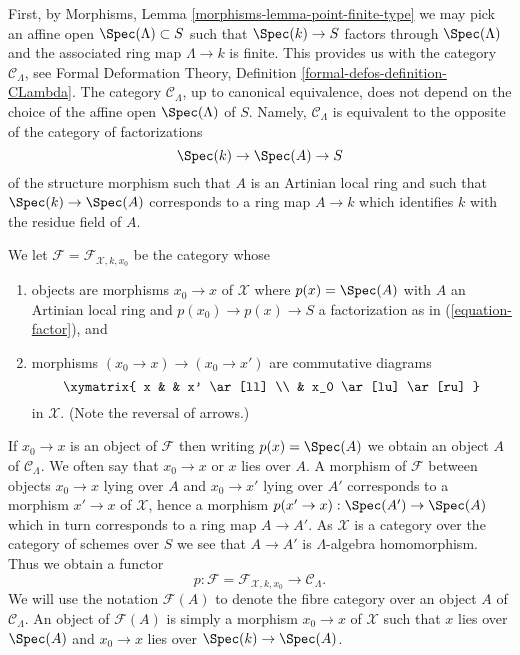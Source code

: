 \medskip\noindent
First, by Morphisms, Lemma \ref{morphisms-lemma-point-finite-type}
we may pick an affine open $\Spec(\Lambda) \subset S$ such that
$\Spec(k) \to S$ factors through $\Spec(\Lambda)$ and the associated
ring map $\Lambda \to k$ is finite. This provides us with the category
$\mathcal{C}_\Lambda$, see
Formal Deformation Theory, Definition \ref{formal-defos-definition-CLambda}.
The category $\mathcal{C}_\Lambda$, up to canonical equivalence,
does not depend on the choice of the affine open $\Spec(\Lambda)$ of $S$.
Namely, $\mathcal{C}_\Lambda$ is equivalent to the opposite
of the category of factorizations
\begin{equation}
\label{equation-factor}
\Spec(k) \to \Spec(A) \to S
\end{equation}
of the structure morphism such that $A$ is an Artinian local ring and
such that $\Spec(k) \to \Spec(A)$ corresponds to a ring map $A \to k$ which
identifies $k$ with the residue field of $A$.

\medskip\noindent
We let $\mathcal{F} = \mathcal{F}_{\mathcal{X}, k, x_0}$ be the
category whose
\begin{enumerate}
\item objects are morphisms $x_0 \to x$ of $\mathcal{X}$ where
$p(x) = \Spec(A)$ with $A$ an Artinian local ring and
$p(x_0) \to p(x) \to S$ a factorization as in (\ref{equation-factor}), and
\item morphisms $(x_0 \to x) \to (x_0 \to x')$ are commutative
diagrams
$$
\xymatrix{
x & & x' \ar[ll] \\
& x_0 \ar[lu] \ar[ru]
}
$$
in $\mathcal{X}$. (Note the reversal of arrows.)
\end{enumerate}
If $x_0 \to x$ is an object of $\mathcal{F}$ then writing $p(x) = \Spec(A)$
we obtain an object $A$ of $\mathcal{C}_\Lambda$. We often say that
$x_0 \to x$ or $x$ lies over $A$. A morphism of $\mathcal{F}$ between objects
$x_0 \to x$ lying over $A$ and $x_0 \to x'$ lying over $A'$
corresponds to a morphism $x' \to x$ of $\mathcal{X}$, hence a morphism
$p(x' \to x) : \Spec(A') \to \Spec(A)$ which in turn corresponds to a
ring map $A \to A'$. As $\mathcal{X}$ is a category
over the category of schemes over $S$ we see that $A \to A'$ is
$\Lambda$-algebra homomorphism. Thus we obtain a functor
\begin{equation}
\label{equation-predeformation-category}
p : \mathcal{F} = \mathcal{F}_{\mathcal{X}, k, x_0}
\longrightarrow
\mathcal{C}_\Lambda.
\end{equation}
We will use the notation $\mathcal{F}(A)$ to denote the fibre category
over an object $A$ of $\mathcal{C}_\Lambda$. An object of $\mathcal{F}(A)$
is simply a morphism $x_0 \to x$ of $\mathcal{X}$ such that
$x$ lies over $\Spec(A)$ and $x_0 \to x$ lies over $\Spec(k) \to \Spec(A)$.

